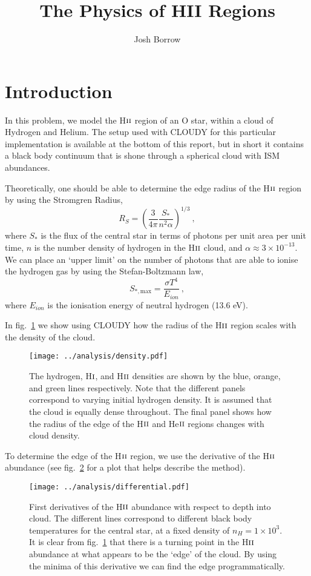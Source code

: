 \documentclass[a4paper]{article}
\title{The Physics of HII Regions}\label{the-physics-of-hii-regions}
\author{Josh Borrow}
\begin{document}
\maketitle

\section{Introduction}

In this problem, we model the H\(\textsc{ii}\) region of an O star,
within a cloud of Hydrogen and Helium. The setup used with CLOUDY for
this particular implementation is available at the bottom of this
report, but in short it contains a black body continuum that is shone
through a spherical cloud with ISM abundances.

Theoretically, one should be able to determine the edge radius of the
H\(\textsc{ii}\) region by using the Stromgren Radius, \[ R_S = \left(
\frac{3}{4\pi} \frac{S_*}{n^2 \alpha} \right)^{1/3} ~, \] where \(S_*\)
is the flux of the central star in terms of photons per unit area per
unit time, \(n\) is the number density of hydrogen in the
H\(\textsc{ii}\) cloud, and \(\alpha \approx 3\times 10^{-13}\). We can
place an `upper limit' on the number of photons that are able to ionise
the hydrogen gas by using the Stefan-Boltzmann law,
\[ S_{*, \mathrm{max}} = \frac{\sigma T^4}{E_{ion}}~, \] where
\(E_{ion}\) is the ionisation energy of neutral hydrogen (13.6 eV).

In fig.~\ref{fig:density} we show using CLOUDY how the radius of the
H\(\textsc{ii}\) region scales with the density of the cloud.

\begin{figure}
\centering
\texttt{[image: ../analysis/density.pdf]}
\caption{The hydrogen, H\(\textsc{i}\), and H\(\textsc{ii}\) densities
are shown by the blue, orange, and green lines respectively. Note that
the different panels correspond to varying initial hydrogen density. It
is assumed that the cloud is equally dense throughout. The final panel
shows how the radius of the edge of the H\(\textsc{ii}\) and
He\(\textsc{ii}\) regions changes with cloud
density.}\label{fig:density}
\end{figure}

To determine the edge of the H\(\textsc{ii}\) region, we use the
derivative of the H\(\textsc{ii}\) abundance (see
fig.~\ref{fig:derivative} for a plot that helps describe the method).

\begin{figure}
\centering
\texttt{[image: ../analysis/differential.pdf]}
\caption{First derivatives of the H\(\textsc{ii}\) abundance with
respect to depth into cloud. The different lines correspond to different
black body temperatures for the central star, at a fixed density of
\(n_H = 1\times 10^3\). It is clear from fig.~\ref{fig:density} that
there is a turning point in the H\(\textsc{ii}\) abundance at what
appears to be the `edge' of the cloud. By using the minima of this
derivative we can find the edge programmatically.}\label{fig:derivative}
\end{figure}
\end{document}

